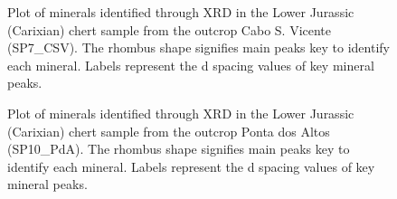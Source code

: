 \documentclass[
  a4paper,
  DIV=11,
  numbers=noendperiod]{scrreprt}
\begin{document}
\begin{figure}


\caption{\label{fig-xrd-sp7}Plot of minerals identified through XRD in
the Lower Jurassic (Carixian) chert sample from the outcrop Cabo S.
Vicente (SP7\_CSV). The rhombus shape signifies main peaks key to
identify each mineral. Labels represent the d spacing values of key
mineral peaks.}

\end{figure}%

\begin{figure}


\caption{\label{fig-xrd-sp10}Plot of minerals identified through XRD in
the Lower Jurassic (Carixian) chert sample from the outcrop Ponta dos
Altos (SP10\_PdA). The rhombus shape signifies main peaks key to
identify each mineral. Labels represent the d spacing values of key
mineral peaks.}

\end{figure}%
\end{document}

